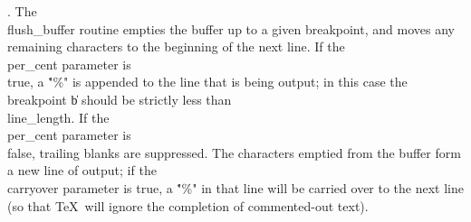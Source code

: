 . The \\{flush\_buffer} routine empties the buffer up to a given
breakpoint,
and moves any remaining characters to the beginning of the next line.
If the \\{per\_cent} parameter is \\{true}, a \.{"\%"} is appended to the line
that is being output; in this case the breakpoint \|b should be strictly
less than \\{line\_length}. If the \\{per\_cent} parameter is \\{false},
trailing blanks are suppressed.
The characters emptied from the buffer form a new line of output;
if the \\{carryover} parameter is true, a \.{"\%"} in that line will be
carried over to the next line (so that \TeX\ will ignore the completion
of commented-out text).

